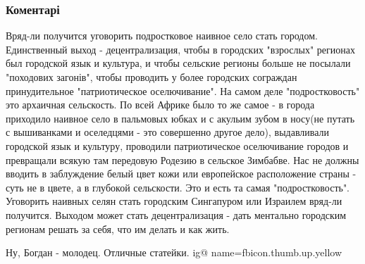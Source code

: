  
 
 
 
 
\subsubsection{Коментарі}
\label{sec:24_08_2021.fb.savruckij_bogdan.1.pora_vzroslet_nezavisimost.cmt}

\begin{itemize}
 

Вряд-ли получится уговорить подростковое наивное село стать городом.
Единственный выход - децентрализация, чтобы в городских "взрослых" регионах был
городской язык и культура, и чтобы сельские регионы больше не посылали
"походових загонів", чтобы проводить у более городских сограждан принудительное
"патриотическое оселючивание". На самом деле "подростковость" это архаичная
сельскость. По всей Африке было то же самое - в города приходило наивное село в
пальмовых юбках и с акульим зубом в носу(не путать с вышиванками и оселедцями -
это совершенно другое дело), выдавливали городской язык и культуру, проводили
патриотическое оселючивание городов и превращали всякую там передовую Родезию в
сельское Зимбабве. Нас не должны вводить в заблуждение белый цвет кожи или
европейское расположение страны - суть не в цвете, а в глубокой сельскости. Это
и есть та самая "подростковость". Уговорить наивных селян стать городским
Сингапуром или Израилем вряд-ли получится. Выходом может стать децентрализация
- дать ментально городским регионам решать за себя, что им делать и как жить.


 
Ну, Богдан - молодец. Отличные статейки.
\ifcmt
  ig@ name=fbicon.thumb.up.yellow
\fi


\end{itemize}
